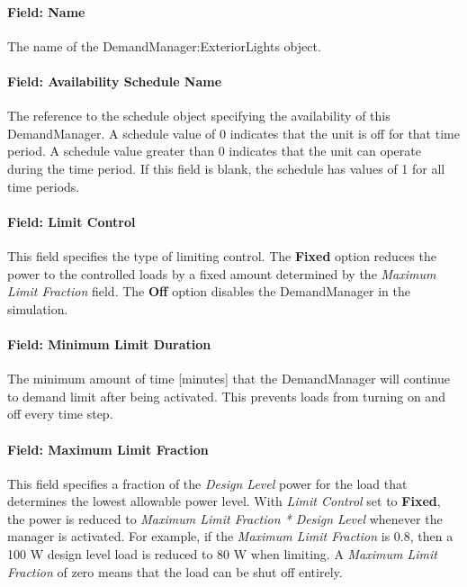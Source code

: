 \paragraph{Field: Name}\label{field-name-1-008}

The name of the DemandManager:ExteriorLights object.

\paragraph{Field: Availability Schedule Name}\label{field-availability-schedule-name-003}

The reference to the schedule object specifying the availability of this DemandManager. A schedule value of 0 indicates that the unit is off for that time period. A schedule value greater than 0 indicates that the unit can operate during the time period. If this field is blank, the schedule has values of 1 for all time periods.

\paragraph{Field: Limit Control}\label{field-limit-control}

This field specifies the type of limiting control. The \textbf{Fixed} option reduces the power to the controlled loads by a fixed amount determined by the \emph{Maximum Limit Fraction} field. The \textbf{Off} option disables the DemandManager in the simulation.

\paragraph{Field: Minimum Limit Duration}\label{field-minimum-limit-duration}

The minimum amount of time {[}minutes{]} that the DemandManager will continue to demand limit after being activated. This prevents loads from turning on and off every time step.

\paragraph{Field: Maximum Limit Fraction}\label{field-maximum-limit-fraction}

This field specifies a fraction of the \emph{Design Level} power for the load that determines the lowest allowable power level. With \emph{Limit Control} set to \textbf{Fixed}, the power is reduced to \emph{Maximum Limit Fraction * Design Level} whenever the manager is activated. For example, if the \emph{Maximum Limit Fraction} is 0.8, then a 100 W design level load is reduced to 80 W when limiting. A \emph{Maximum Limit Fraction} of zero means that the load can be shut off entirely.

